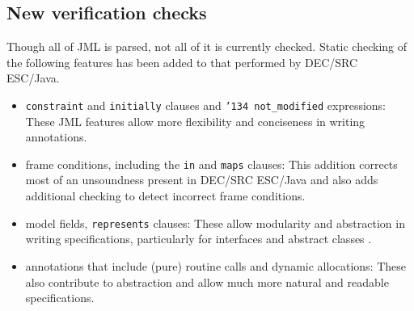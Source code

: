 \documentclass{acm_proc_article-sp}
\begin{document}
\subsection{New verification checks}
Though all of JML is parsed, not all of it is currently checked.
Static checking of the following features has been added to that performed by
DEC/SRC ESC/Java.
\setlength{\partopsep}{0in}\setlength{\parskip}{0in}\setlength{\itemsep}{0in}\setlength{\topsep}{0in}
\begin{itemize}
\setlength{\partopsep}{0in}\setlength{\parskip}{0in}\setlength{\itemsep}{0in}\setlength{\topsep}{0in}
\item \texttt{constraint} and \texttt{initially} clauses and \texttt{\char'134 not\_modified} expressions: These JML features allow more flexibility and conciseness in writing annotations.
\item frame conditions, including the \texttt{in} and \texttt{maps} clauses:  This addition corrects
most of an unsoundness present in DEC/SRC ESC/Java and also adds additional checking to detect
incorrect frame conditions.
\item model fields, \texttt{represents} clauses: These allow modularity and abstraction in
writing specifications, particularly for interfaces and abstract classes \cite{Cheon-etal03}.
\item annotations that include (pure) routine calls and dynamic allocations: These also contribute
to abstraction and allow much more natural and readable specifications.
\end{itemize}
\end{document}

